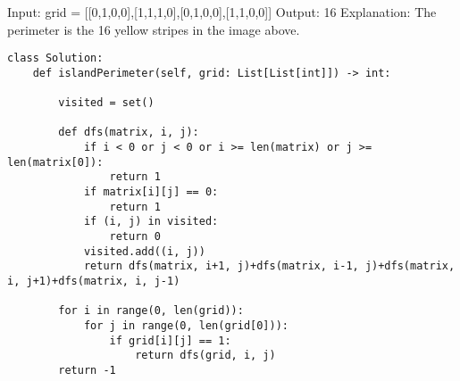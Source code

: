 \documentclass[24pt, a4]{article}
\begin{document}
Input: grid = [[0,1,0,0],[1,1,1,0],[0,1,0,0],[1,1,0,0]]
Output: 16
Explanation: The perimeter is the 16 yellow stripes in the image above.
\begin{lstlisting}
class Solution:
    def islandPerimeter(self, grid: List[List[int]]) -> int:
        
        visited = set()
        
        def dfs(matrix, i, j):
            if i < 0 or j < 0 or i >= len(matrix) or j >= len(matrix[0]):
                return 1
            if matrix[i][j] == 0:
                return 1
            if (i, j) in visited:
                return 0
            visited.add((i, j))
            return dfs(matrix, i+1, j)+dfs(matrix, i-1, j)+dfs(matrix, i, j+1)+dfs(matrix, i, j-1)
        
        for i in range(0, len(grid)):
            for j in range(0, len(grid[0])):
                if grid[i][j] == 1:
                    return dfs(grid, i, j)
        return -1
\end{lstlisting}
\end{document}
